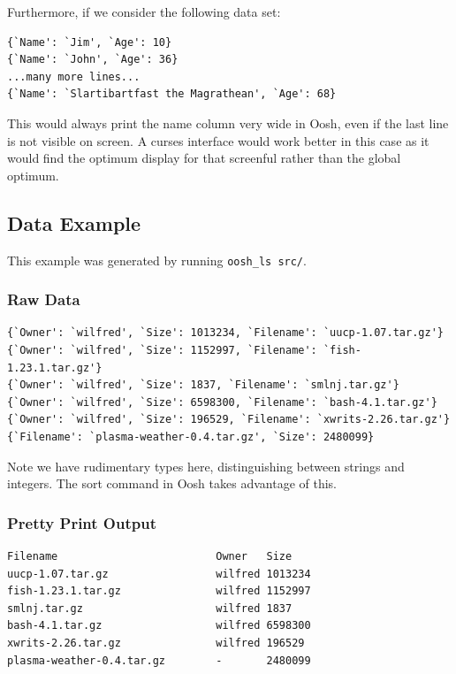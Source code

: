 \documentclass[12pt,twoside,notitlepage]{report}
\begin{document}
Furthermore, if we consider the following data set:


\begin{verbatim}
{`Name': `Jim', `Age': 10}
{`Name': `John', `Age': 36}
...many more lines...
{`Name': `Slartibartfast the Magrathean', `Age': 68}
\end{verbatim}

This would always print the name column very wide in Oosh, even if the last
line is not visible on screen. A curses interface would work better in
this case as it would find the optimum display for that screenful
rather than the global optimum.



\subsection{Data Example}

This example was generated by running {\tt oosh\_ls src/}.

\subsubsection{Raw Data}
\label{rawdata}
\begin{verbatim}
{`Owner': `wilfred', `Size': 1013234, `Filename': `uucp-1.07.tar.gz'}
{`Owner': `wilfred', `Size': 1152997, `Filename': `fish-1.23.1.tar.gz'}
{`Owner': `wilfred', `Size': 1837, `Filename': `smlnj.tar.gz'}
{`Owner': `wilfred', `Size': 6598300, `Filename': `bash-4.1.tar.gz'}
{`Owner': `wilfred', `Size': 196529, `Filename': `xwrits-2.26.tar.gz'}
{`Filename': `plasma-weather-0.4.tar.gz', `Size': 2480099}
\end{verbatim}
Note we have rudimentary types here, distinguishing between strings and
integers. The sort command in Oosh takes advantage of this.

\subsubsection{Pretty Print Output}
\begin{verbatim}
Filename                         Owner   Size      
uucp-1.07.tar.gz                 wilfred 1013234   
fish-1.23.1.tar.gz               wilfred 1152997   
smlnj.tar.gz                     wilfred 1837      
bash-4.1.tar.gz                  wilfred 6598300   
xwrits-2.26.tar.gz               wilfred 196529    
plasma-weather-0.4.tar.gz        -       2480099
\end{verbatim}
\end{document}
